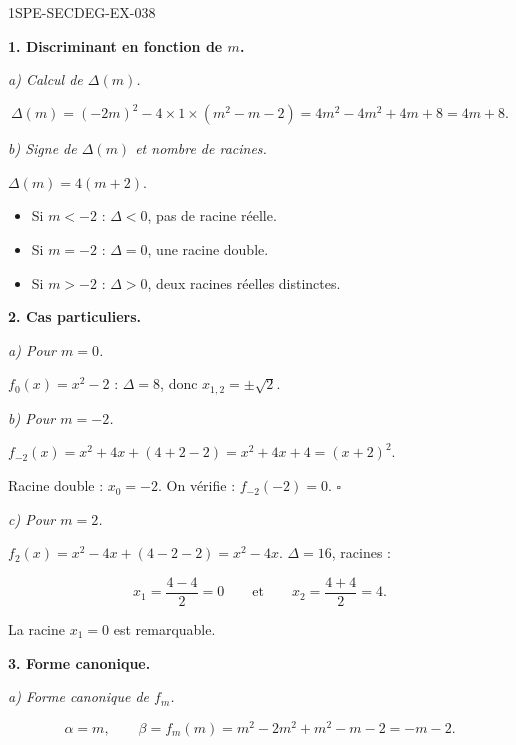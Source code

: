 \begin{corrige}{1SPE-SECDEG-EX-038}

\textbf{1. Discriminant en fonction de $m$.}

\textit{a) Calcul de $\Delta(m)$.}


\[\Delta(m) = (-2m)^2 - 4 \times 1 \times (m^2 - m - 2) = 4m^2 - 4m^2 + 4m + 8 = 4m + 8.\]

\textit{b) Signe de $\Delta(m)$ et nombre de racines.}


$\Delta(m) = 4(m + 2)$.
\begin{itemize}
  \item Si $m < -2$ : $\Delta < 0$, pas de racine réelle.
  \item Si $m = -2$ : $\Delta = 0$, une racine double.
  \item Si $m > -2$ : $\Delta > 0$, deux racines réelles distinctes.
\end{itemize}

\medskip
\textbf{2. Cas particuliers.}

\textit{a) Pour $m = 0$.}


$f_0(x) = x^2 - 2$ : $\Delta = 8$, donc $x_{1,2} = \pm\sqrt{2}$.

\textit{b) Pour $m = -2$.}


$f_{-2}(x) = x^2 + 4x + (4 + 2 - 2) = x^2 + 4x + 4 = (x+2)^2$.

Racine double : $x_0 = -2$. On vérifie : $f_{-2}(-2) = 0$. \hfill $\square$

\textit{c) Pour $m = 2$.}

$f_2(x) = x^2 - 4x + (4 - 2 - 2) = x^2 - 4x$. $\Delta = 16$, racines :

\[x_1 = \frac{4 - 4}{2} = 0 \qquad \text{et} \qquad x_2 = \frac{4 + 4}{2} = 4.\]

La racine $x_1 = 0$ est remarquable.

\medskip
\textbf{3. Forme canonique.}

\textit{a) Forme canonique de $f_m$.}


\[\alpha = m, \qquad \beta = f_m(m) = m^2 - 2m^2 + m^2 - m - 2 = -m - 2.\]


\end{corrige}
